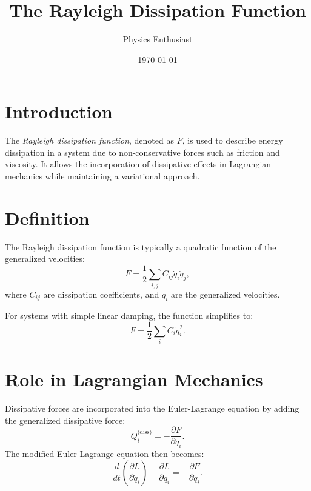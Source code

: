 \documentclass[a4paper,12pt]{article}
\title{The Rayleigh Dissipation Function}
\author{Physics Enthusiast}
\date{\today}
\begin{document}
\maketitle

\section{Introduction}
The \textit{Rayleigh dissipation function}, denoted as \( F \), is used to describe energy dissipation in a system due to non-conservative forces such as friction and viscosity. It allows the incorporation of dissipative effects in Lagrangian mechanics while maintaining a variational approach.

\section{Definition}
The Rayleigh dissipation function is typically a quadratic function of the generalized velocities:
\begin{equation*}
    F = \frac{1}{2} \sum_{i,j} C_{ij} \dot{q}_i \dot{q}_j,
\end{equation*}
where \( C_{ij} \) are dissipation coefficients, and \( \dot{q}_i \) are the generalized velocities.

For systems with simple linear damping, the function simplifies to:
\begin{equation*}
    F = \frac{1}{2} \sum_{i} C_i \dot{q}_i^2.
\end{equation*}

\section{Role in Lagrangian Mechanics}
Dissipative forces are incorporated into the Euler-Lagrange equation by adding the generalized dissipative force:
\begin{equation*}
    Q_i^{\text{(diss)}} = - \frac{\partial F}{\partial \dot{q}_i}.
\end{equation*}
The modified Euler-Lagrange equation then becomes:
\begin{equation*}
    \frac{d}{dt} \left( \frac{\partial L}{\partial \dot{q}_i} \right) - \frac{\partial L}{\partial q_i} = -\frac{\partial F}{\partial \dot{q}_i}.
\end{equation*}
\end{document}
